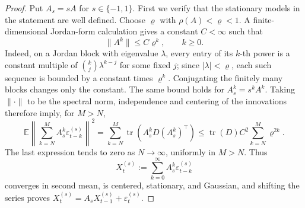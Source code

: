 \documentclass{article}
\begin{document}
\begin{proof}
Put \(A_s=sA\) for \(s\in\{-1,1\}\).  First we verify that the stationary models in the statement are well defined.  Choose \(\varrho\) with \(\rho(A)<\varrho<1\).  A finite-dimensional Jordan-form calculation gives a constant \(C<\infty\) such that
\[
 \lVert A^k\rVert\le C \varrho^k,
 \qquad k\ge0.
\]
Indeed, on a Jordan block with eigenvalue \(\lambda\), every entry of its \(k\)-th power is a constant multiple of \(\binom{k}{j}\lambda^{k-j}\) for some fixed \(j\); since \(|\lambda|<\varrho\), each such sequence is bounded by a constant times \(\varrho^k\).  Conjugating the finitely many blocks changes only the constant.  The same bound holds for \(A_s^k=s^kA^k\).  Taking \(\lVert\cdot\rVert\) to be the spectral norm, independence and centering of the innovations therefore imply, for \(M>N\),
\[
 \mathbb E\left\lVert
   \sum_{k=N}^{M}A_s^k\varepsilon_{t-k}^{(s)}
 \right\rVert^2
 =\sum_{k=N}^{M}\operatorname{tr}
   \left(A_s^kD(A_s^k)^\top\right)
 \le \operatorname{tr}(D)C^2\sum_{k=N}^{M}\varrho^{2k}.
\]
The last expression tends to zero as \(N\to\infty\), uniformly in \(M>N\).  Thus
\[
 X_t^{(s)}:=\sum_{k=0}^{\infty}A_s^k\varepsilon_{t-k}^{(s)}
\]
converges in second mean, is centered, stationary, and Gaussian, and shifting the series proves
\(X_t^{(s)}=A_sX_{t-1}^{(s)}+\varepsilon_t^{(s)}\).


\end{proof}
\end{document}
